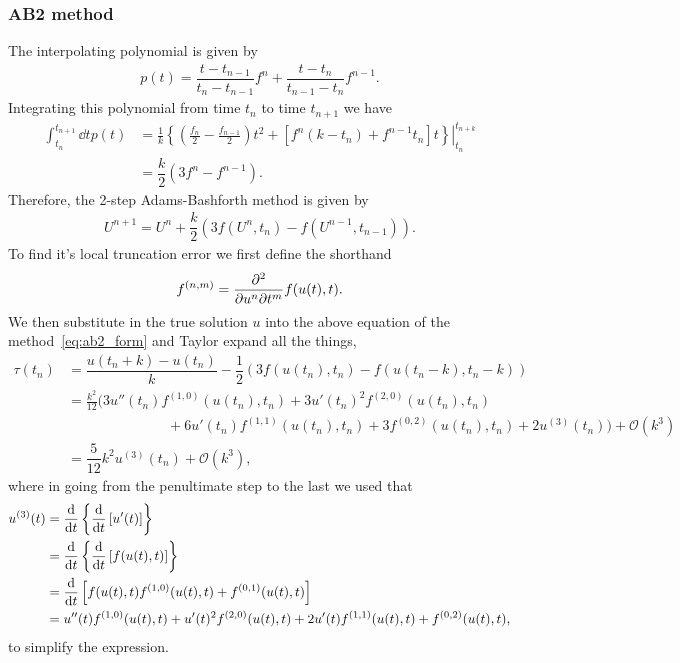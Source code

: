 \documentclass[12pt]{article}
\newcommand{\bO}{\mathcal{O}}
\begin{document}
\subsubsection*{AB2 method}
The interpolating polynomial is given by 
\begin{align}
    p(t) = \dfrac{t-t_{n-1}}{t_{n}-t_{n-1}}f^{n} + \dfrac{t-t_{n}}{t_{n-1}-t_{n}}f^{n-1}.
\end{align}
Integrating this polynomial from time $t_{n}$ to time $t_{n+1}$ we have
\begin{subequations}
    \begin{align}
        \int_{t_{n}}^{t_{n+1}}\dd{t}p(t) &= \left.\frac{1}{k} \left\{\left(\frac{f_{n}}{2}-\frac{f_{n-1}}{2}\right)t^2
        +\left[f^{n}(k-t_{n})+f^{n-1}t_{n}\right]t\right\}\right|_{t_{n}}^{t_{n+k}}\\
        &=\dfrac{k}{2}\left(3f^{n}-f^{n-1}\right).
    \end{align}
\end{subequations}
Therefore, the 2-step Adams-Bashforth method is given by 
\begin{align}
    U^{n+1} = U^{n} + \dfrac{k}{2}\left(3f(U^{n},t_{n})-f(U^{n-1},t_{n-1})\right).\label{eq:ab2_form}
\end{align}
To find it's local truncation error we first define the shorthand \[f^{(n,m)} = \pdv{}{u^{n}}{t^{m}}f(u(t),t). \] We then substitute in the true solution $u$ into the above equation of the method~\eqref{eq:ab2_form} and Taylor expand all the things,
\begin{subequations}
    \begin{align}
        \tau(t_{n}) &= \dfrac{u(t_{n}+k)-u(t_{n})}{k} - \dfrac{1}{2}\left(3f(u(t_{n}),t_{n})-f(u(t_{n}-k),t_{n}-k)\right)\\
        &= \frac{k^2}{12} \Bigg( 3 u''(t_{n})
        f^{(1,0)}(u(t_{n}),t_{n})+3 u'(t_{n})^2 f^{(2,0)}(u(t_{n}),t_{n})\nonumber\\
        &\hspace{3cm}+6 u'(t_{n}) f^{(1,1)}(u(t_{n}),t_{n})+3
        f^{(0,2)}(u(t_{n}),t_{n})+2 u^{(3)}(t_{n})\Bigg)+\bO\left(k^3\right)\\
        &= \dfrac{5}{12}k^2 u^{(3)}(t_{n}) + \bO(k^{3}),
    \end{align}
\end{subequations}
where in going from the penultimate step to the last we used that
\begin{subequations}
    \begin{align}
        u^{(3)}(t) &= \dv{}{t}\left\{\dv{t} \left[u^{\prime}(t)\right]\right\}\\
        &= \dv{}{t}\left\{\dv{t} \left[f(u(t),t)\right]\right\}\\
        &= \dv{}{t}\left[f(u(t),t)f^{(1,0)}(u(t),t)+f^{(0,1)}(u(t),t)\right]\\
        &= u''(t) f^{(1,0)}(u(t),t)+u'(t)^2 f^{(2,0)}(u(t),t)+2 u'(t)
        f^{(1,1)}(u(t),t)+f^{(0,2)}(u(t),t),
    \end{align}
\end{subequations}
to simplify the expression.
\end{document}
